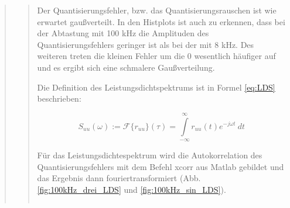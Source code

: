 \begin{quote}
\begin{quote}
        Der Quantisierungsfehler, bzw. das Quantisierungsrauschen ist wie erwartet gaußverteilt.
        In den Histplots ist auch zu erkennen, dass bei der Abtastung mit 100 kHz die Amplituden des
        Quantisierungsfehlers geringer ist als bei der mit 8 kHz. Des weiteren treten die kleinen Fehler um die 0
        wesentlich häufiger auf und es ergibt sich eine schmalere Gaußverteilung.
         
        \vspace{2em}
        
        Die Definition des Leistungsdichtspektrums ist in Formel \ref{eq:LDS} beschrieben:
        
        \begin{equation}
          S_{uu}(\omega):=\mathcal{F} \{r_{uu}\}(\tau)=\int\limits_{-\infty}^{\infty} r_{uu}(t)e^{-j \omega t} \ dt
          \label{eq:LDS}
        \end{equation}
        
        
        Für das Leistungsdichtespektrum wird die Autokorrelation des Quantisierungsfehlers mit dem Befehl xcorr aus
        Matlab gebildet und das Ergebnis dann fouriertransformiert (Abb. \ref{fig:100kHz_drei_LDS} und
        \ref{fig:100kHz_sin_LDS}).
        
        \begin{center}
            \begin{tabular}{ll}
            

\end{tabular}
\end{center}
\end{quote}
\end{quote}
